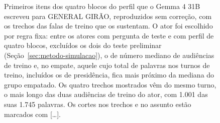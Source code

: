 \begin{figure}[!t]
  \caption{Primeiros itens dos quatro blocos do perfil que o Gemma 4 31B escreveu para GENERAL
  GIRÃO, reproduzidos sem correção, com os trechos das falas de treino que os sustentam. O ator foi
  escolhido por regra fixa: entre os atores com pergunta de teste e com perfil de quatro blocos,
  excluídos os dois do teste preliminar (Seção~\ref{sec:metodo-simulacao}), o de número mediano de
  audiências de treino e, no empate, aquele cujo total de palavras nos turnos de treino, incluídos os
  de presidência, fica mais próximo da mediana do grupo empatado. Os quatro trechos mostrados vêm do
  mesmo turno, o mais longo das duas audiências de treino do ator, com 1.001 das suas 1.745 palavras.
  Os cortes nos trechos e no assunto estão marcados com {[\ldots]}.}
  \label{fig:perfil}
\end{figure}
